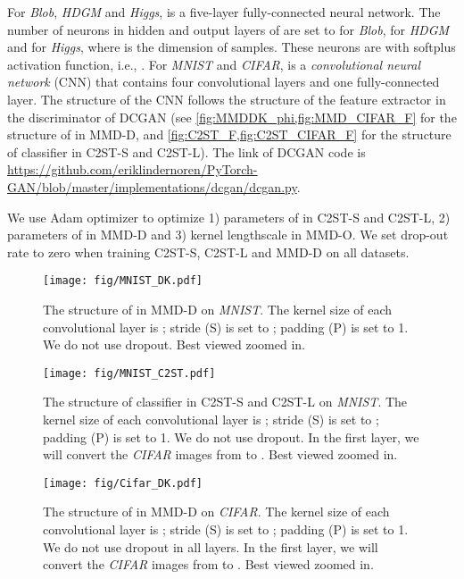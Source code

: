 \documentclass{article}
\begin{document}
For \emph{Blob}, \emph{HDGM} and \emph{Higgs},  is a five-layer fully-connected neural network. The number of neurons in hidden and output layers of  are set to  for \emph{Blob},  for \emph{HDGM} and  for \emph{Higgs}, where  is the dimension of samples. These neurons are with softplus activation function, i.e., . For \emph{MNIST} and \emph{CIFAR},  is a \emph{convolutional neural network} (CNN) that contains four convolutional layers and one fully-connected layer. The structure of the CNN follows the structure of the feature extractor in the discriminator of DCGAN \citep{DCGAN_Radford} (see \cref{fig:MMDDK_phi,fig:MMD_CIFAR_F} for the structure of  in MMD-D, and \cref{fig:C2ST_F,fig:C2ST_CIFAR_F} for the structure of classifier  in C2ST-S and C2ST-L). The link of DCGAN code is \url{https://github.com/eriklindernoren/PyTorch-GAN/blob/master/implementations/dcgan/dcgan.py}.

We use Adam optimizer \citep{Adam:optimizer} to optimize 1) parameters of  in C2ST-S and C2ST-L, 2) parameters of  in MMD-D and 3) kernel lengthscale in MMD-O. We set drop-out rate to zero when training C2ST-S, C2ST-L and MMD-D on all datasets.

\begin{figure}[!t]
    \begin{center}
        \texttt{[image: fig/MNIST\_DK.pdf]}
        \caption{The structure of  in MMD-D on \emph{MNIST}. The kernel size of each convolutional layer is ; stride (S) is set to ; padding (P) is set to 1. We do not use dropout. Best viewed zoomed in.}\label{fig:MMDDK_phi}
    \end{center}
\end{figure}


\begin{figure}[!t]
    \begin{center}
        \texttt{[image: fig/MNIST\_C2ST.pdf]}
        \caption{The structure of classifier  in C2ST-S and C2ST-L on \emph{MNIST}. The kernel size of each convolutional layer is ; stride (S) is set to ; padding (P) is set to 1. We do not use dropout. In the first layer, we will convert the \emph{CIFAR} images from  to . Best viewed zoomed in.}    \label{fig:C2ST_F}
    \end{center}
\end{figure}

\begin{figure}[!t]
    \begin{center}
        \texttt{[image: fig/Cifar\_DK.pdf]}
        \caption{The structure of  in MMD-D on \emph{CIFAR}. The kernel size of each convolutional layer is ; stride (S) is set to ; padding (P) is set to 1. We do not use dropout in all layers. In the first layer, we will convert the \emph{CIFAR} images from  to . Best viewed zoomed in.}  \label{fig:MMD_CIFAR_F}
    \end{center}
\end{figure}
\end{document}
